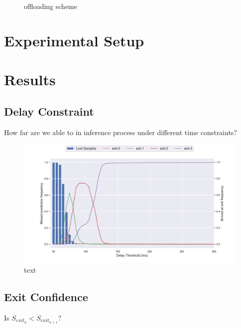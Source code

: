 \begin{figure}
	\caption[Offloading scheme]{offloading scheme}
	\label{fig:offloading-scheme}
\end{figure} 

\section{Experimental Setup}

\section{Results}

\subsection{Delay Constraint}

How far are we able to in inference process under different time constraints? 

\begin{figure}
	\centering
	\includegraphics[width=\linewidth]{figures/edge/exit-reached.png}
	\caption[short text]{text}
	\label{fig:exit-reached}
\end{figure}

\subsection{Exit Confidence}

Is $S_{exit_{n}} < S_{exit_{n+1}}$?


